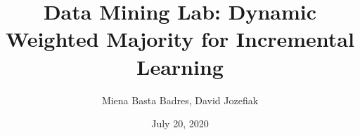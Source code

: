 \documentclass[t]{beamer}
\title{Data Mining Lab: Dynamic Weighted Majority for Incremental Learning}
\date{July 20, 2020}
\author{Miena Basta Badres, David Jozefiak}
\begin{document}

\begin{frame}
\titlepage
\end{frame}


\end{document}

